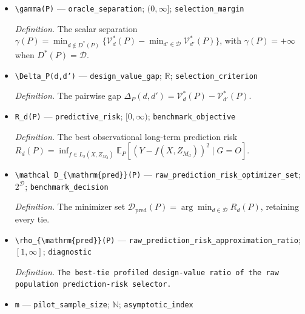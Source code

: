 \documentclass{article}
\begin{document}
\begin{itemize}
  \par\smallskip\noindent\emph{Definition.} The oracle set \(D^*(P)=\arg\min_{d\in\mathcal D}\mathcal V_d^*(P)\), retaining every minimizer under ties.
  \item \texttt{\textbackslash{}\allowbreak{}gamma(P)} --- \texttt{oracle\_\allowbreak{}separation}; \((0,\infty]\); \texttt{selection\_\allowbreak{}margin}
  \par\smallskip\noindent\emph{Definition.} The scalar separation \(\gamma(P)=\min_{d\notin D^*(P)}\{\mathcal V_d^*(P)-\min_{d'\in\mathcal D}\mathcal V_{d'}^*(P)\}\), with \(\gamma(P)=+\infty\) when \(D^*(P)=\mathcal D\).
  \item \texttt{\textbackslash{}\allowbreak{}Delta\_\allowbreak{}P(d,\allowbreak{}d')} --- \texttt{design\_\allowbreak{}value\_\allowbreak{}gap}; \(\mathbb R\); \texttt{selection\_\allowbreak{}criterion}
  \par\smallskip\noindent\emph{Definition.} The pairwise gap \(\Delta_P(d,d')=\mathcal V_d^*(P)-\mathcal V_{d'}^*(P)\).
  \item \texttt{R\_\allowbreak{}d(P)} --- \texttt{predictive\_\allowbreak{}risk}; \([0,\infty)\); \texttt{benchmark\_\allowbreak{}objective}
  \par\smallskip\noindent\emph{Definition.} The best observational long-term prediction risk \(R_d(P)=\inf_{f\in L_2(X,Z_{M_d})}\mathbb E_P[(Y-f(X,Z_{M_d}))^2\mid G=O]\).
  \item \texttt{\textbackslash{}\allowbreak{}mathcal D\_\allowbreak{}\{\textbackslash{}\allowbreak{}mathrm\{pred\}\allowbreak{}\}\allowbreak{}(P)} --- \texttt{raw\_\allowbreak{}prediction\_\allowbreak{}risk\_\allowbreak{}optimizer\_\allowbreak{}set}; \(2^{\mathcal D}\); \texttt{benchmark\_\allowbreak{}decision}
  \par\smallskip\noindent\emph{Definition.} The minimizer set \(\mathcal D_{\mathrm{pred}}(P)=\arg\min_{d\in\mathcal D}R_d(P)\), retaining every tie.
  \item \texttt{\textbackslash{}\allowbreak{}rho\_\allowbreak{}\{\textbackslash{}\allowbreak{}mathrm\{pred\}\allowbreak{}\}\allowbreak{}(P)} --- \texttt{raw\_\allowbreak{}prediction\_\allowbreak{}risk\_\allowbreak{}approximation\_\allowbreak{}ratio}; \([1,\infty]\); \texttt{diagnostic}
  \par\smallskip\noindent\emph{Definition.} \texttt{The best-\allowbreak{}tie profiled design-\allowbreak{}value ratio of the raw population prediction-\allowbreak{}risk selector.}
  \item \texttt{m} --- \texttt{pilot\_\allowbreak{}sample\_\allowbreak{}size}; \(\mathbb N\); \texttt{asymptotic\_\allowbreak{}index}

\end{itemize}
\end{document}
